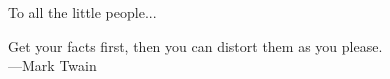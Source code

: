 \begin{acknowledge}
To all the little people...	

    \clearpage
    \vspace{3in}
    \begin{dedication}
    Get your facts first, then you can distort them as you please. \\ ---Mark Twain
    \end{dedication}

\end{acknowledge}
